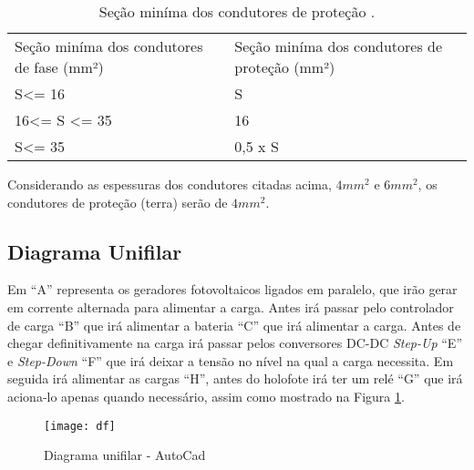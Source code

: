 \begin{table}[h]
 \centering
 \caption{Seção miníma dos condutores de proteção \cite{protecao}.} \label{secao}
 {\renewcommand\arraystretch{1.25}
 \begin{tabular}{ l l }
  \cline{1-1}\cline{2-2}  
    \multicolumn{1}{|p{4.133cm}|}{Seção miníma dos condutores de fase (mm²) \centering } &
    \multicolumn{1}{p{4.450cm}|}{Seção miníma dos condutores de proteção (mm²) \centering }
  \\  
  \cline{1-1}\cline{2-2}  
    \multicolumn{1}{|p{4.133cm}|}{S\textless = 16 \centering } &
    \multicolumn{1}{p{4.450cm}|}{S \centering }
  \\  
  \cline{1-1}\cline{2-2}  
    \multicolumn{1}{|p{4.133cm}|}{16\textless = S \textless = 35 \centering } &
    \multicolumn{1}{p{4.450cm}|}{16 \centering }
  \\  
  \cline{1-1}\cline{2-2}  
    \multicolumn{1}{|p{4.133cm}|}{S\textless = 35 \centering } &
    \multicolumn{1}{p{4.450cm}|}{0,5 x S \centering }
  \\  
  \hline

 \end{tabular} }
\end{table}

Considerando as espessuras dos condutores citadas acima, $4mm^2$ e $6mm^2$, os condutores de proteção (terra) serão de $4mm^2$.

\subsection{Diagrama Unifilar}

Em “A” representa os geradores fotovoltaicos ligados em paralelo, que irão gerar em corrente alternada para alimentar a carga. Antes irá passar pelo controlador de carga “B” que irá alimentar a bateria “C” que irá alimentar a carga. Antes de chegar definitivamente na carga irá passar pelos conversores DC-DC \textit{Step-Up} “E” e \textit{Step-Down} “F” que irá deixar a tensão no nível na qual a carga necessita. Em seguida irá alimentar as cargas “H”, antes do holofote irá ter um relé “G” que irá aciona-lo apenas quando necessário, assim como mostrado na Figura \ref{fig:diagrama}.


\begin{figure}[H]
\centering
\texttt{[image: df]}
\caption{Diagrama unifilar - AutoCad}
\label{fig:diagrama}
\end{figure}




